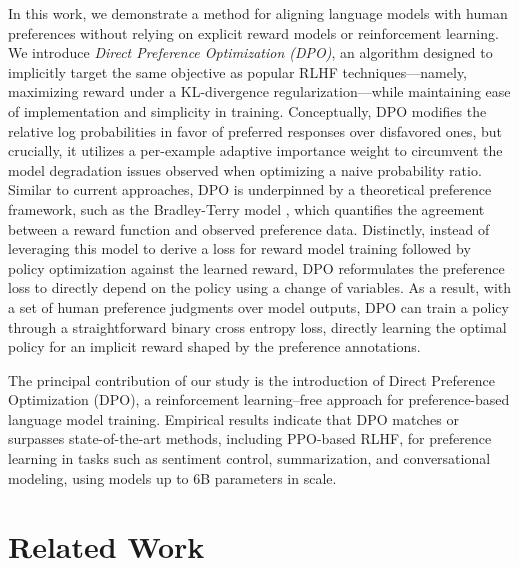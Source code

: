 In this work, we demonstrate a method for aligning language models with human preferences without relying on explicit reward models or reinforcement learning. We introduce \textit{{Direct Preference Optimization} (DPO)}, an algorithm designed to implicitly target the same objective as popular RLHF techniques—namely, maximizing reward under a KL-divergence regularization—while maintaining ease of implementation and simplicity in training. Conceptually, DPO modifies the relative log probabilities in favor of preferred responses over disfavored ones, but crucially, it utilizes a per-example adaptive importance weight to circumvent the model degradation issues observed when optimizing a naive probability ratio. Similar to current approaches, DPO is underpinned by a theoretical preference framework, such as the Bradley-Terry model \cite{bradley1952rankanalysis}, which quantifies the agreement between a reward function and observed preference data. Distinctly, instead of leveraging this model to derive a loss for reward model training followed by policy optimization against the learned reward, DPO reformulates the preference loss to directly depend on the policy using a change of variables. As a result, with a set of human preference judgments over model outputs, DPO can train a policy through a straightforward binary cross entropy loss, directly learning the optimal policy for an implicit reward shaped by the preference annotations.

The principal contribution of our study is the introduction of Direct Preference Optimization (DPO), a reinforcement learning–free approach for preference-based language model training. Empirical results indicate that DPO matches or surpasses state-of-the-art methods, including PPO-based RLHF, for preference learning in tasks such as sentiment control, summarization, and conversational modeling, using models up to 6B parameters in scale.

\section{Related Work}


